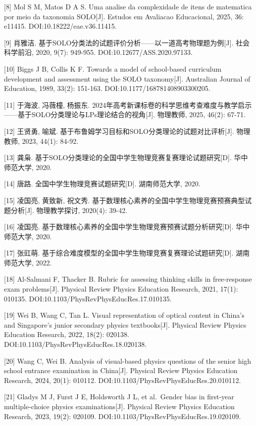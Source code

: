 \documentclass[
  12pt,
  a4paper,twoside,openany]{ctexbook}
\begin{document}
{[}8{]} Mol S M, Matos D A S. Uma analise da complexidade de itens de
matematica por meio da taxonomia SOLO{[}J{]}. Estudos em Avaliacao
Educacional, 2025, 36: e11415. DOI:10.18222/eae.v36.11415.

{[}9{]} 肖雅洁.
基于SOLO分类法的试题评价分析------以一道高考物理题为例{[}J{]}.
社会科学前沿, 2020, 9(7): 949-955. DOI:10.12677/ASS.2020.97133.

{[}10{]} Biggs J B, Collis K F. Towards a model of school-based
curriculum development and assessment using the SOLO taxonomy{[}J{]}.
Australian Journal of Education, 1989, 33(2): 151-163.
DOI:10.1177/168781408903300205.

{[}11{]} 于海波, 冯薇橦, 杨振东.
2024年高考新课标卷的科学思维考查难度与教学启示------基于SOLO分类理论与LPs理论结合的视角{[}J{]}.
物理教师, 2025, 46(2): 67-71.

{[}12{]} 王贤勇, 喻斌.
基于布鲁姆学习目标和SOLO分类理论的试题对比评析{[}J{]}. 物理教师, 2023,
44(1): 84-92.

{[}13{]} 龚枭.
基于SOLO分类理论的全国中学生物理竞赛复赛理论试题研究{[}D{]}.
华中师范大学, 2020.

{[}14{]} 唐路. 全国中学生物理竞赛试题研究{[}D{]}. 湖南师范大学, 2020.

{[}15{]} 凌国亮, 黄致新, 祝文秀.
基于数理核心素养的全国中学生物理竞赛预赛典型试题分析{[}J{]}.
物理教学探讨, 2020(4): 39-42.

{[}16{]} 凌国亮.
基于数理核心素养的全国中学生物理竞赛预赛试题分析研究{[}D{]}.
华中师范大学, 2020.

{[}17{]} 张豇萌.
基于综合难度模型的全国中学生物理竞赛复赛理论试题研究{[}D{]}.
湖南师范大学, 2022.

{[}18{]} Al-Salmani F, Thacker B. Rubric for assessing thinking skills
in free-response exam problems{[}J{]}. Physical Review Physics Education
Research, 2021, 17(1): 010135. DOI:10.1103/PhysRevPhysEducRes.17.010135.

{[}19{]} Wei B, Wang C, Tan L. Visual representation of optical content
in China's and Singapore's junior secondary physics textbooks{[}J{]}.
Physical Review Physics Education Research, 2022, 18(2): 020138.
DOI:10.1103/PhysRevPhysEducRes.18.020138.

{[}20{]} Wang C, Wei B. Analysis of visual-based physics questions of
the senior high school entrance examination in China{[}J{]}. Physical
Review Physics Education Research, 2024, 20(1): 010112.
DOI:10.1103/PhysRevPhysEducRes.20.010112.

{[}21{]} Gladys M J, Furst J E, Holdsworth J L, et al.~Gender bias in
first-year multiple-choice physics examinations{[}J{]}. Physical Review
Physics Education Research, 2023, 19(2): 020109.
DOI:10.1103/PhysRevPhysEducRes.19.020109.
\end{document}
